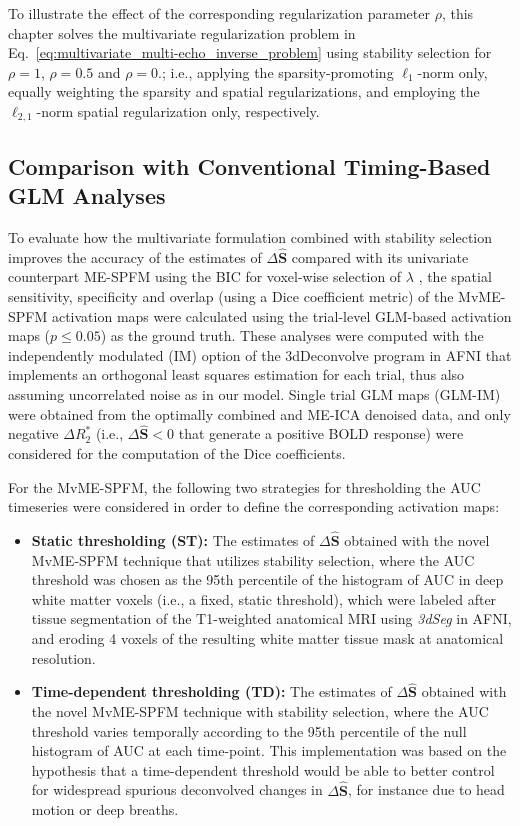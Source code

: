 To illustrate the effect of the corresponding regularization parameter $\rho$,
this chapter solves the multivariate regularization problem in
Eq.~\eqref{eq:multivariate_multi-echo_inverse_problem} using stability selection
for $\rho=1$, $\rho=0.5$ and $\rho=0$.; i.e., applying the sparsity-promoting
$\ell_1$-norm only, equally weighting the sparsity and spatial regularizations,
and employing the $\ell_{2,1}$-norm spatial regularization only, respectively.

\subsection{Comparison with Conventional Timing-Based GLM Analyses}

To evaluate how the multivariate formulation combined with stability selection
improves the accuracy of the estimates of $\Delta \hat{\mathbf{S}}$ compared
with its univariate counterpart ME-SPFM using the BIC for voxel-wise selection
of $\lambda$ \citep{CaballeroGaudes2019deconvolutionalgorithmmulti}, the spatial
sensitivity, specificity and overlap (using a Dice coefficient metric) of the
MvME-SPFM activation maps were calculated using the trial-level GLM-based
activation maps ($p \leq 0.05$) as the ground truth. These analyses were
computed with the independently modulated (IM) option of the 3dDeconvolve
program in AFNI that implements an orthogonal least squares estimation for each
trial, thus also assuming uncorrelated noise as in our model. Single trial GLM
maps (GLM-IM) were obtained from the optimally combined and ME-ICA denoised
data, and only negative $\Delta R_2^*$ (i.e., $\Delta \hat{\mathbf{S}} < 0$ that
generate a positive BOLD response) were considered for the computation of the
Dice coefficients. 

For the MvME-SPFM, the following two strategies for thresholding the AUC
timeseries were considered in order to define the corresponding activation maps:
\begin{itemize}
    \item \textbf{Static thresholding {(ST)}:} The estimates of $\Delta
    \hat{\mathbf{S}}$ obtained with the novel MvME-SPFM technique that utilizes
    stability selection, where the AUC threshold was chosen as the 95th
    percentile of the histogram of AUC in deep white matter voxels (i.e., a
    fixed, static threshold), which were labeled after tissue segmentation of
    the T1-weighted anatomical MRI using \textit{3dSeg} in AFNI, and eroding 4
    voxels of the resulting white matter tissue mask at anatomical resolution. 
    \item \textbf{Time-dependent thresholding {(TD)}:} The estimates of $\Delta
    \hat{\mathbf{S}}$ obtained with the novel MvME-SPFM technique with stability
    selection, where the AUC threshold varies temporally according to the 95th
    percentile of the null histogram of AUC at each time-point. This
    implementation was based on the hypothesis that a time-dependent threshold
    would be able to better control for widespread spurious deconvolved changes
    in $\Delta \hat{\mathbf{S}}$, for instance due to head motion or deep
    breaths. 
\end{itemize}


